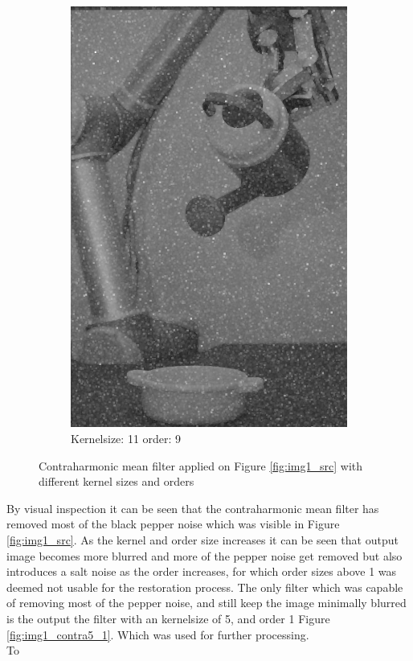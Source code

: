 \begin{figure}[H]
\begin{subfigure}[b]{0.30\textwidth}
        \includegraphics[width=\textwidth]{img1/img_1_gaus_11_9.png}
        \caption{Kernelsize: 11 order: 9}
		 \label{fig:img1_contra11_9}
    \end{subfigure}
    \caption{Contraharmonic mean filter applied on Figure \ref{fig:img1_src} with different kernel sizes and orders}
    \label{fig:img1_contra}
\end{figure}

By visual inspection it can be seen that the contraharmonic mean filter has removed most of the black pepper noise which was visible in Figure \ref{fig:img1_src}. As the kernel and order size increases it can be seen that output image becomes more blurred and more of the pepper noise  get removed but also introduces a salt noise as the order increases, for which order sizes above 1 was deemed not usable for the  restoration process.   The only filter which was capable of removing most of the pepper noise, and still keep the image minimally blurred is the output the filter with an kernelsize of 5, and order 1 Figure \ref{fig:img1_contra5_1}. Which was used for further processing. \\

To


